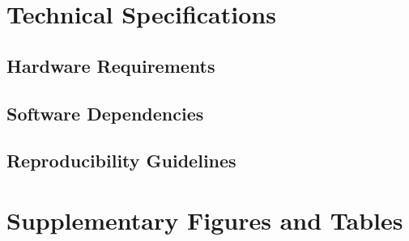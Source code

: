 \documentclass[
	english,
	ruledheaders=section,
	class=report,
	thesis={type=master},
	accentcolor=9c,
	custommargins=true,
	marginpar=false,
	parskip=half-,
	fontsize=11pt,
]{tudapub}
\begin{document}
\chapter{Technical Specifications}
\label{app:technical_specs}

\section{Hardware Requirements}
\label{app:hardware_requirements}

\section{Software Dependencies}
\label{app:software_dependencies}

\section{Reproducibility Guidelines}
\label{app:reproducibility}

\chapter{Supplementary Figures and Tables}
\label{app:supplementary}
\end{document}
